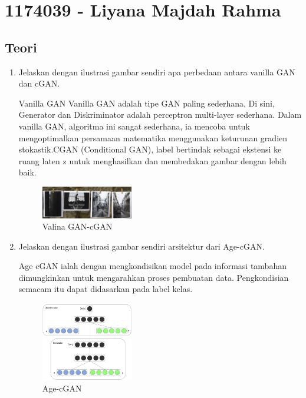 \section{1174039 - Liyana Majdah Rahma}

\subsection{Teori}
\begin{enumerate}

        \item Jelaskan dengan ilustrasi gambar sendiri apa perbedaan antara vanilla GAN dan cGAN.

		Vanilla GAN Vanilla GAN adalah tipe GAN paling sederhana. Di sini, Generator dan Diskriminator adalah perceptron multi-layer sederhana. Dalam vanilla GAN, algoritma ini sangat sederhana, ia mencoba untuk mengoptimalkan persamaan matematika menggunakan keturunan gradien stokastik.CGAN (Conditional GAN), label bertindak sebagai ekstensi ke ruang laten z untuk menghasilkan dan membedakan gambar dengan lebih baik. 

			\begin{figure}[H]
            	\includegraphics[width=4cm]{figures/1174039/chapter9/teori1.PNG}
           		\centering
           		\caption{Valina GAN-cGAN}
        	\end{figure}

        \item Jelaskan dengan ilustrasi gambar sendiri arsitektur dari Age-cGAN.

		Age cGAN ialah dengan mengkondisikan model pada informasi tambahan dimungkinkan untuk mengarahkan proses pembuatan data. Pengkondisian semacam itu dapat didasarkan pada label kelas.

			\begin{figure}[H]
				\includegraphics[width=4cm]{figures/1174039/chapter9/teori2.PNG}
            		\centering
           		\caption{Age-cGAN}
       	 	\end{figure}


\end{enumerate}
